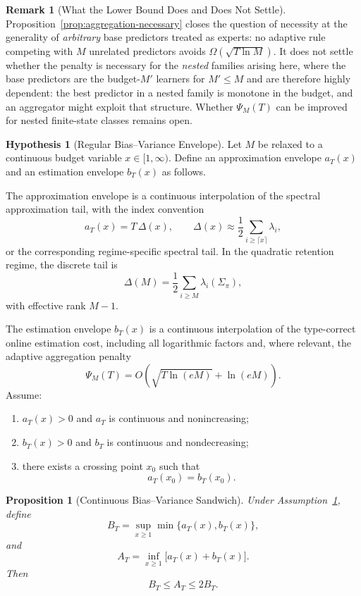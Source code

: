 \documentclass[12pt]{article}
\newtheorem{proposition}[theorem]{Proposition}
\theoremstyle{definition}
\newtheorem{remark}[theorem]{Remark}
\newtheorem{assumption}[theorem]{Hypothesis}
\newcommand{\PsiAgg}{\Psi}
\begin{document}
\begin{remark}[What the Lower Bound Does and Does Not Settle]
\label{rem:aggregation-scope}
Proposition~\ref{prop:aggregation-necessary} closes the question of necessity
at the generality of \emph{arbitrary} base predictors treated as experts: no
adaptive rule competing with $M$ unrelated predictors avoids
$\Omega(\sqrt{T\ln M})$.  It does not settle whether the penalty is necessary
for the \emph{nested} families arising here, where the base predictors are the
budget-$M'$ learners for $M'\le M$ and are therefore highly dependent: the best
predictor in a nested family is monotone in the budget, and an aggregator might
exploit that structure.  Whether $\PsiAgg_M(T)$ can be improved for nested
finite-state classes remains open.
\end{remark}

\begin{assumption}[Regular Bias--Variance Envelope]
\label{ass:regular-bv-envelope}
Let $M$ be relaxed to a continuous budget variable $x\in[1,\infty)$.  Define
an approximation envelope $a_T(x)$ and an estimation envelope $b_T(x)$ as
follows.

The approximation envelope is a continuous interpolation of the spectral
approximation tail, with the index convention
\[
a_T(x)
=
T\,\Delta(x),
\qquad
\Delta(x)
\approx
\frac12
\sum_{i\ge \lceil x\rceil}
\lambda_i,
\]
or the corresponding regime-specific spectral tail.  In the quadratic
retention regime, the discrete tail is
\[
\Delta(M)
=
\frac12
\sum_{i\ge M}
\lambda_i(\Sigma_\pi),
\]
with effective rank $M-1$.

The estimation envelope $b_T(x)$ is a continuous interpolation of the
type-correct online estimation cost, including all logarithmic factors and,
where relevant, the adaptive aggregation penalty
\[
\PsiAgg_M(T)
=
O\!\left(
\sqrt{T\ln(eM)}
+
\ln(eM)
\right).
\]
Assume:
\begin{enumerate}[label=(\roman*)]
\item $a_T(x)>0$ and $a_T$ is continuous and nonincreasing;
\item $b_T(x)>0$ and $b_T$ is continuous and nondecreasing;
\item there exists a crossing point $x_0$ such that
\[
a_T(x_0)=b_T(x_0).
\]
\end{enumerate}
\end{assumption}

\begin{proposition}[Continuous Bias--Variance Sandwich]
\label{prop:continuous-bv-sandwich}
Under Assumption~\ref{ass:regular-bv-envelope}, define
\[
B_T
=
\sup_{x\ge1}
\min\{a_T(x),b_T(x)\},
\]
and
\[
A_T
=
\inf_{x\ge1}
\bigl[a_T(x)+b_T(x)\bigr].
\]
Then
\[
B_T
\le
A_T
\le
2B_T.
\]
\end{proposition}
\end{document}

